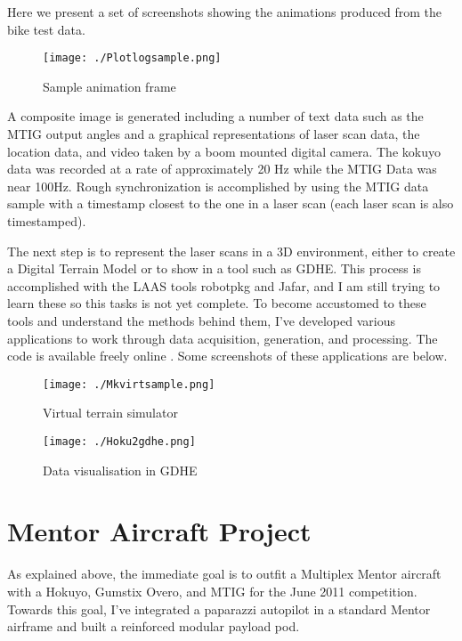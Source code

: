 \documentclass[a4paper,11pt]{report}
\begin{document}
Here we present a set of screenshots showing the animations produced from the bike test data.

\begin{figure}[h]
 \texttt{[image: ./Plotlogsample.png]}
 \caption{Sample animation frame}
 \label{fig:plotlogsample}
\end{figure}

A composite image is generated including a number of text data such as the MTIG output angles and a graphical representations of laser scan data, the location data, and video taken by a boom mounted digital camera. The kokuyo data was recorded at a rate of approximately 20 Hz while the MTIG Data was near 100Hz. Rough synchronization is accomplished by using the MTIG data sample with a timestamp closest to the one in a laser scan (each laser scan is also timestamped).

The next step is to represent the laser scans in a 3D environment, either to create a Digital Terrain Model or to show in a tool such as GDHE. This process is accomplished with the LAAS tools robotpkg and Jafar, and I am still trying to learn these so this tasks is not yet complete. To become accustomed to these tools and understand the methods behind them, I've developed various applications to work through data acquisition, generation, and processing. The code is available freely online \cite{laserhawk_git}. Some screenshots of these applications are below.

\begin{figure}[h]
 \centering
 \texttt{[image: ./Mkvirtsample.png]}
 \caption{Virtual terrain simulator}
 \label{fig:mkvirt}
\end{figure}

\begin{figure}[h]
 \centering
 \texttt{[image: ./Hoku2gdhe.png]}
 \caption{Data visualisation in GDHE}
 \label{fig:hoku2gdhe}
\end{figure}


\chapter{Mentor Aircraft Project}

As explained above, the immediate goal is to outfit a Multiplex Mentor aircraft with a Hokuyo, Gumstix Overo, and MTIG for the June 2011 competition. Towards this goal, I've integrated a paparazzi autopilot in a standard Mentor airframe and built a reinforced modular payload pod. 
\end{document}
